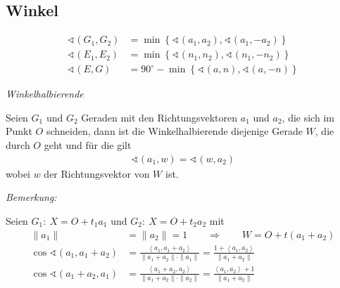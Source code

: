 \subsection*{Winkel} %
\label{sub:Winkel}

\begin{minipage}{0.6\textwidth}
    \begin{align*}
        \sphericalangle(G_1,G_2) & = \min\left\{ \sphericalangle(a_1,a_2), \sphericalangle(a_1,-a_2) \right\}\\
        \sphericalangle(E_1,E_2) & = \min\left\{ \sphericalangle(n_1,n_2), \sphericalangle(n_1,-n_2) \right\}\\
        \sphericalangle(E,G) & = 90^{\circ} - \min\left\{ \sphericalangle(a,n), \sphericalangle(a,-n) \right\}
    \end{align*}
\end{minipage}
\begin{minipage}{0.4\textwidth}
    \begin{center}
    \end{center}
\end{minipage}

\begin{mydef}\textit{Winkelhalbierende}\medskip

    Seien $G_1$ und $G_2$ Geraden mit den Richtungsvektoren $a_1$ und $a_2$, die sich im Punkt $O$ schneiden, dann ist die Winkelhalbierende diejenige Gerade $W$, die durch $O$ geht und für die gilt
    \begin{align*}
        \sphericalangle(a_1,w) = \sphericalangle(w,a_2)
    \end{align*}
    wobei $w$ der Richtungsvektor von $W$ ist.
\end{mydef}

\textit{Bemerkung:}

Seien $G_1:\ X = O + t_1 a_1$ und $G_2:\ X = O + t_2 a_2$ mit
\begin{align*}
    \|a_1\| & = \|a_2\| = 1 \qquad \Rightarrow \qquad W = O + t\left( a_1 + a_2 \right)\\
    \cos \sphericalangle(a_1, a_1 + a_2) & = \frac{\left\langle a_1, a_1 + a_2 \right\rangle}{\|a_1 + a_2\| \cdot \|a_1\|} = \frac{1 + \left\langle a_1, a_2 \right\rangle}{\|a_1 + a_2\|}\\
    \cos \sphericalangle(a_1 + a_2, a_1) & = \frac{\left\langle a_1 + a_2, a_2 \right\rangle}{\|a_1 + a_2\| \cdot \|a_2\|} = \frac{\left\langle a_1, a_2 \right\rangle + 1}{\|a_1 + a_2\|}\\
\end{align*}

